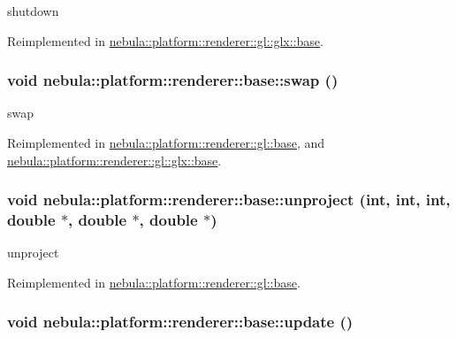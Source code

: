 shutdown 

Reimplemented in \hyperlink{classnebula_1_1platform_1_1renderer_1_1gl_1_1glx_1_1base_ac6647cc66f798bbf9d500b8f4254cd94}{nebula::platform::renderer::gl::glx::base}.\hypertarget{classnebula_1_1platform_1_1renderer_1_1base_a0c23f96aaae8c8fbe421bd0c734da6b9}{
\subsubsection[{swap}]{\setlength{\rightskip}{0pt plus 5cm}void nebula::platform::renderer::base::swap ()}}
\label{classnebula_1_1platform_1_1renderer_1_1base_a0c23f96aaae8c8fbe421bd0c734da6b9}


swap 

Reimplemented in \hyperlink{classnebula_1_1platform_1_1renderer_1_1gl_1_1base_a99776235861491abc4fa8fc5eec7ebf9}{nebula::platform::renderer::gl::base}, and \hyperlink{classnebula_1_1platform_1_1renderer_1_1gl_1_1glx_1_1base_ae401e12e3f15975e9cf09723b3617341}{nebula::platform::renderer::gl::glx::base}.\hypertarget{classnebula_1_1platform_1_1renderer_1_1base_a29759f9e2d0ac477b16ad27dc8aa4f0f}{
\subsubsection[{unproject}]{\setlength{\rightskip}{0pt plus 5cm}void nebula::platform::renderer::base::unproject (int, \/  int, \/  int, \/  double $\ast$, \/  double $\ast$, \/  double $\ast$)}}
\label{classnebula_1_1platform_1_1renderer_1_1base_a29759f9e2d0ac477b16ad27dc8aa4f0f}


unproject 

Reimplemented in \hyperlink{classnebula_1_1platform_1_1renderer_1_1gl_1_1base_a6f060e673e035fb037517423351ae11c}{nebula::platform::renderer::gl::base}.\hypertarget{classnebula_1_1platform_1_1renderer_1_1base_aa8290b3d6ac2b1908d44489002876723}{
\subsubsection[{update}]{\setlength{\rightskip}{0pt plus 5cm}void nebula::platform::renderer::base::update ()}}
\label{classnebula_1_1platform_1_1renderer_1_1base_aa8290b3d6ac2b1908d44489002876723}


